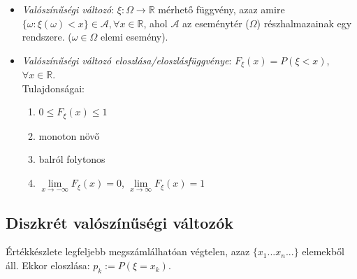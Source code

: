 \documentclass[margin=0px]{article}
\begin{document}
\begin{itemize}
    \item \textit{Valószínűségi változó}: $\xi : \Omega \to \mathbb{R}$ mérhető függvény, azaz amire $\{\omega : \xi(\omega) < x\} \in \mathcal{A}, \forall x \in \mathbb{R}$, ahol $\mathcal{A}$ az eseménytér ($\Omega$) részhalmazainak egy rendszere. ($\omega \in \Omega$ elemi esemény).
    \item \textit{Valószínűségi változó eloszlása/eloszlásfüggvénye}: $F_{\xi}(x) = P(\xi < x)$, $\forall x \in \mathbb{R}$. \\
          Tulajdonságai:
          \begin{enumerate}
              \item $0 \leq F_{\xi}(x) \leq 1$
              \item monoton növő
              \item balról folytonos
              \item $\lim\limits_{x \to -\infty}{F_{\xi}(x)} = 0$, $\lim\limits_{x \to \infty}{F_{\xi}(x)} = 1$
          \end{enumerate}
\end{itemize}

\subsection{Diszkrét valószínűségi változók}

Értékkészlete legfeljebb megszámlálhatóan végtelen, azaz $\{x_1 ... x_n ... \}$ elemekből áll. Ekkor eloszlása: $p_k := P(\xi = x_k)$.
\end{document}
